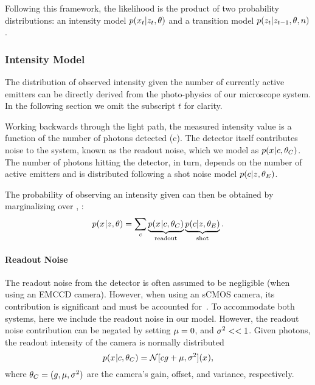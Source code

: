   Following this framework, the likelihood is the product of two probability
  distributions: an intensity model $p(x_{t}|z_{t},\theta)$ and a
  transition model $p(z_{t}|z_{t-1},\theta,n)$.

\subsubsection{Intensity Model}

The distribution of observed intensity  given the number of
currently active emitters  can be directly derived from the photo-physics
of our microscope system.
  In the following section we omit the subscript $t$ for clarity.
  
Working backwards through the light path, the measured intensity value \x{}
is a function of the number of photons \photons detected
(c).
  The detector itself contributes noise to the system, known as the readout
  noise, which we model as $p(x_{}|c,\theta_C)$.
  The number of photons hitting the detector, in turn, depends on the number of
  active emitters \z{} and is distributed following a shot noise model
  $p(c|z_{},\theta_E)$.

The probability of observing an intensity \x{} given \z{} can then be obtained
by marginalizing over \photons, \ie:
  \begin{equation}
    p(x_{}|z_{},\theta) =
      \sum_c
        \underbrace{p(x_{}|c,\theta_C)}_{\text{readout}}
        \underbrace{p(c|z_{},\theta_E)}_{\text{shot}}
    \text{.}
    \label{eq:method:marginalized_intensity}
  \end{equation}

\paragraph{Readout Noise}

The readout noise from the detector is often assumed to be negligible (\ie when
using an EMCCD camera).
  However, when using an sCMOS camera, its contribution is significant and 
  must be accounted for~\citep{huang_video-rate_2013}.
  To accommodate both systems, here we include the readout noise in our model.
  However, the readout noise contribution can be negated by setting $\mu=0$, 
  and $\sigma^2 << 1$.
  Given \photons photons, the readout intensity of the camera is normally
  distributed~\citep{huang_video-rate_2013}
  \begin{equation}
    p(x_{}|c,\theta_C) = \mathcal{N}[cg + \mu, \sigma^2](x_{})
    \text{,}
  \end{equation}
  where $\theta_C = (g, \mu, \sigma^2)$ are the camera's gain,
  offset, and variance, respectively.

